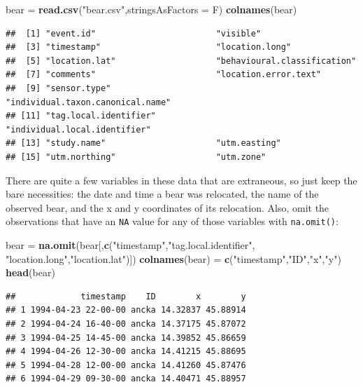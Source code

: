\documentclass[]{book}
\newenvironment{Shaded}{\begin{snugshade}}{\end{snugshade}}
\newcommand{\KeywordTok}[1]{\textcolor[rgb]{0.13,0.29,0.53}{\textbf{#1}}}
\newcommand{\DataTypeTok}[1]{\textcolor[rgb]{0.13,0.29,0.53}{#1}}
\newcommand{\StringTok}[1]{\textcolor[rgb]{0.31,0.60,0.02}{#1}}
\newcommand{\NormalTok}[1]{#1}
\theoremstyle{definition}
\theoremstyle{definition}
\theoremstyle{definition}
\theoremstyle{remark}
\begin{document}
\begin{Shaded}
\begin{Highlighting}[]
\NormalTok{bear =}\StringTok{ }\KeywordTok{read.csv}\NormalTok{(}\StringTok{"bear.csv"}\NormalTok{,}\DataTypeTok{stringsAsFactors =}\NormalTok{ F)}
\KeywordTok{colnames}\NormalTok{(bear)}
\end{Highlighting}
\end{Shaded}

\begin{verbatim}
##  [1] "event.id"                        "visible"                        
##  [3] "timestamp"                       "location.long"                  
##  [5] "location.lat"                    "behavioural.classification"     
##  [7] "comments"                        "location.error.text"            
##  [9] "sensor.type"                     "individual.taxon.canonical.name"
## [11] "tag.local.identifier"            "individual.local.identifier"    
## [13] "study.name"                      "utm.easting"                    
## [15] "utm.northing"                    "utm.zone"
\end{verbatim}

There are quite a few variables in these data that are extraneous, so
just keep the bare necessities: the date and time a bear was relocated,
the name of the observed bear, and the x and y coordinates of its
relocation. Also, omit the observations that have an \texttt{NA} value
for any of those variables with \texttt{na.omit()}:

\begin{Shaded}
\begin{Highlighting}[]
\NormalTok{bear =}\StringTok{ }\KeywordTok{na.omit}\NormalTok{(bear[,}\KeywordTok{c}\NormalTok{(}\StringTok{"timestamp"}\NormalTok{,}\StringTok{"tag.local.identifier"}\NormalTok{,}
                        \StringTok{"location.long"}\NormalTok{,}\StringTok{"location.lat"}\NormalTok{)])}
\KeywordTok{colnames}\NormalTok{(bear) =}\StringTok{ }\KeywordTok{c}\NormalTok{(}\StringTok{"timestamp"}\NormalTok{,}\StringTok{"ID"}\NormalTok{,}\StringTok{"x"}\NormalTok{,}\StringTok{"y"}\NormalTok{)}
\KeywordTok{head}\NormalTok{(bear)}
\end{Highlighting}
\end{Shaded}

\begin{verbatim}
##             timestamp    ID        x        y
## 1 1994-04-23 22-00-00 ancka 14.32837 45.88914
## 2 1994-04-24 16-40-00 ancka 14.37175 45.87072
## 3 1994-04-25 14-45-00 ancka 14.39852 45.86659
## 4 1994-04-26 12-30-00 ancka 14.41215 45.88695
## 5 1994-04-28 12-00-00 ancka 14.41260 45.87476
## 6 1994-04-29 09-30-00 ancka 14.40471 45.88957
\end{verbatim}
\end{document}

